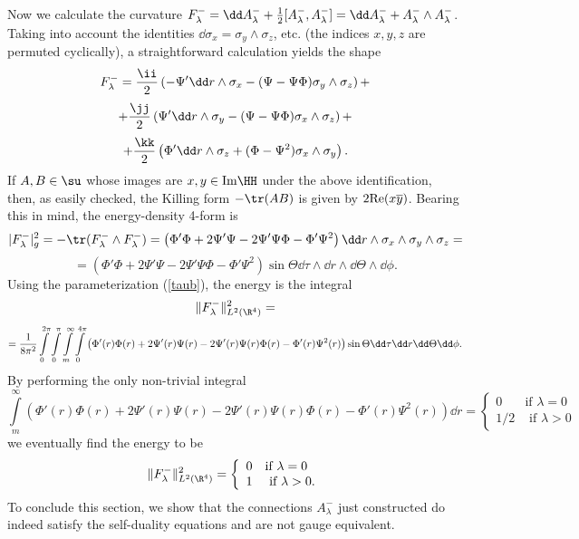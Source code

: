 \documentclass[a4paper,12pt,draft]{article}
\begin{document}
Now we calculate the curvature $F^-_\lambda =\dd A^-_\lambda +{1\over
2}[A^-_\lambda ,A^-_\lambda ]=\dd A^-_\lambda
+A^-_\lambda\wedge A^-_\lambda$. Taking into account the identities 
$\dd\sigma_x=\sigma_y\wedge\sigma_z$, etc. (the indices $x,y,z$ are
permuted cyclically), a straightforward calculation yields the shape
\[F^-_\lambda ={\ii\over 2}\left( -\Psi '\dd r\wedge\sigma_x -(\Psi
-\Psi\Phi )\sigma_y\wedge\sigma_z\right) +\]
\begin{equation}
+{\jj\over 2}\left(\Psi '\dd r\wedge\sigma_y-(\Psi
-\Psi\Phi )\sigma_x\wedge\sigma_z\right) + 
\label{gorbulet}
\end{equation}
\[+{\kk\over 2}\left (\Phi '\dd r\wedge \sigma_z+(\Phi -\Psi^2 
)\sigma_x\wedge\sigma_y\right) .\]
If $A,B\in\su$ whose images are $x,y\in{\rm Im}\HH$ under the above
identification, then, as easily checked, the Killing form $-\tr (AB)$ is
given by $2{\rm Re}(x\overline{y})$. Bearing this in mind, the energy-density 
4-form is  
\[\vert F^-_\lambda\vert^2_g =-\tr (F^-_\lambda\wedge F^-_\lambda
)=\left(\Phi '\Phi +2\Psi '\Psi -2\Psi '\Psi\Phi-\Phi '\Psi^2\right)\dd
r\wedge\sigma_x\wedge\sigma_y\wedge\sigma_z=\]
\begin{equation}
=\left(\Phi '\Phi +2\Psi '\Psi -2\Psi '\Psi\Phi-\Phi
'\Psi^2\right) 
\sin\Theta\dd\tau\wedge\dd r\wedge\dd\Theta\wedge\dd\phi .
\label{energiasuruseg}
\end{equation}
Using the parameterization (\ref{taub}), the energy is the integral
\[\Vert F^-_\lambda\Vert^2_{L^2(\R^4)}=\]
\[={1\over  
8\pi^2}\int\limits_0^{2\pi}\int\limits_0^{\pi}\int\limits_m^\infty\int
\limits_0^{4\pi}\left(\Phi '(r)\Phi (r) +2\Psi '(r)\Psi (r)
-2\Psi '(r)\Psi (r)\Phi (r)-\Phi '(r)\Psi^2(r)\right)\sin\Theta\dd\tau\dd
r\dd\Theta\dd\phi .\]
By performing the only non-trivial integral 
\[\int\limits_m^\infty\left(\Phi '(r)\Phi (r) +2\Psi '(r)\Psi
(r) -2\Psi '(r)\Psi (r)\Phi (r)-\Phi '(r)\Psi^2(r)\right)\dd r=
\left\{ \begin{array}{ll}
                  0 & \mbox{if $\lambda =0$} \\
                 1/2 & \mbox{ if $\lambda >0$}
        \end{array}
\right.\]
we eventually find the energy to be 
\[\Vert F^-_\lambda\Vert^2_{L^2(\R^4)}=
\left\{\begin{array}{ll}
                  0 & \mbox{if $\lambda =0$} \\
                  1 & \mbox{ if $\lambda >0$.}
       \end{array}
\right.\]
To conclude this section, we show that the connections $A_\lambda^-$ just
constructed do indeed satisfy the self-duality equations and are
not gauge equivalent. 
\end{document}
